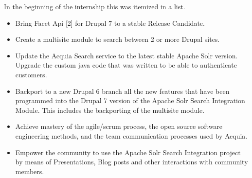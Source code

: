 In the beginning of the internship this was itemized in a list.
\begin{itemize}
  \item Bring Facet Api [2] for Drupal 7 to a stable Release Candidate.
  \item Create a multisite module to search between 2 or more Drupal sites.
  \item Update the Acquia Search service to the latest stable Apache Solr version. Upgrade the custom java code that was written to be able to authenticate customers.
  \item Backport to a new Drupal 6 branch all the new features that have been programmed into the Drupal 7 version of the Apache Solr Search Integration Module. This includes the backporting of the multisite module.
\item Achieve mastery of the agile/scrum process, the open source software engineering methods, and the team communication processes used by Acquia.
\item Empower the community to use the Apache Solr Search Integration project by means of Presentations, Blog posts and other interactions with community members.
\end{itemize}